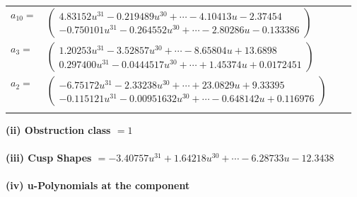 \documentclass[1p]{elsarticle_modified}
\theoremstyle{definition}
\begin{document}
\begin{tabular}{m{7pt} m{180pt} m{7pt} m{180pt} }
\flushright $a_{10}=$&$\begin{pmatrix}4.83152 u^{31}-0.219489 u^{30}+\cdots-4.10413 u-2.37454\\-0.750101 u^{31}-0.264552 u^{30}+\cdots-2.80286 u-0.133386\end{pmatrix}$ \\
\flushright $a_{3}=$&$\begin{pmatrix}1.20253 u^{31}-3.52857 u^{30}+\cdots-8.65804 u+13.6898\\0.297400 u^{31}-0.0444517 u^{30}+\cdots+1.45374 u+0.0172451\end{pmatrix}$ \\
\flushright $a_{2}=$&$\begin{pmatrix}-6.75172 u^{31}-2.33238 u^{30}+\cdots+23.0829 u+9.33395\\-0.115121 u^{31}-0.00951632 u^{30}+\cdots-0.648142 u+0.116976\end{pmatrix}$\\&\end{tabular}
\flushleft \textbf{(ii) Obstruction class $= 1$}\\~\\
\flushleft \textbf{(iii) Cusp Shapes $= -3.40757 u^{31}+1.64218 u^{30}+\cdots-6.28733 u-12.3438$}\\~\\
\newpage\renewcommand{\arraystretch}{1}
\flushleft \textbf{(iv) u-Polynomials at the component}\newline \\
\end{document}
